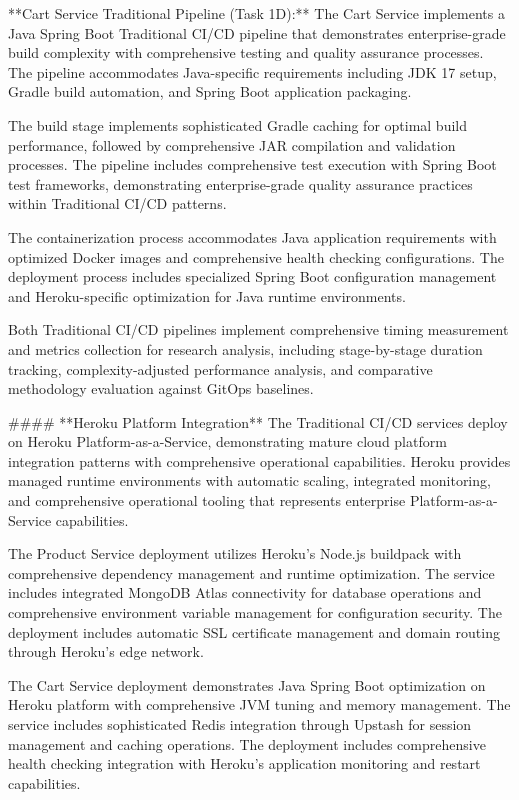 **Cart Service Traditional Pipeline (Task 1D):**
The Cart Service implements a Java Spring Boot Traditional CI/CD pipeline that demonstrates enterprise-grade build complexity with comprehensive testing and quality assurance processes. The pipeline accommodates Java-specific requirements including JDK 17 setup, Gradle build automation, and Spring Boot application packaging.

The build stage implements sophisticated Gradle caching for optimal build performance, followed by comprehensive JAR compilation and validation processes. The pipeline includes comprehensive test execution with Spring Boot test frameworks, demonstrating enterprise-grade quality assurance practices within Traditional CI/CD patterns.

The containerization process accommodates Java application requirements with optimized Docker images and comprehensive health checking configurations. The deployment process includes specialized Spring Boot configuration management and Heroku-specific optimization for Java runtime environments.

Both Traditional CI/CD pipelines implement comprehensive timing measurement and metrics collection for research analysis, including stage-by-stage duration tracking, complexity-adjusted performance analysis, and comparative methodology evaluation against GitOps baselines.

#### **Heroku Platform Integration**
The Traditional CI/CD services deploy on Heroku Platform-as-a-Service, demonstrating mature cloud platform integration patterns with comprehensive operational capabilities. Heroku provides managed runtime environments with automatic scaling, integrated monitoring, and comprehensive operational tooling that represents enterprise Platform-as-a-Service capabilities.

The Product Service deployment utilizes Heroku's Node.js buildpack with comprehensive dependency management and runtime optimization. The service includes integrated MongoDB Atlas connectivity for database operations and comprehensive environment variable management for configuration security. The deployment includes automatic SSL certificate management and domain routing through Heroku's edge network.

The Cart Service deployment demonstrates Java Spring Boot optimization on Heroku platform with comprehensive JVM tuning and memory management. The service includes sophisticated Redis integration through Upstash for session management and caching operations. The deployment includes comprehensive health checking integration with Heroku's application monitoring and restart capabilities.

